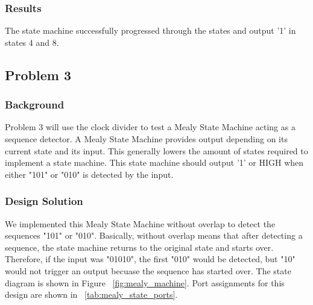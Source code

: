 \documentclass[11pt]{article}
\begin{document}
\subsubsection{Results}
The state machine successfully progressed through the states and output '1' in states 4 and 8.

\subsection{Problem 3}

\subsubsection{Background}
Problem 3 will use the clock divider to test a Mealy State Machine acting as a sequence detector. A Mealy State Machine provides output depending on its current state and its input. This generally lowers the amount of states required to implement a state machine. This state machine should output '1' or HIGH when either "101" or "010" is detected by the input.

\subsubsection{Design Solution}
We implemented this Mealy State Machine without overlap to detect the sequences "101" or "010". Basically, without overlap means that after detecting a sequence, the state machine returns to the original state and starts over. Therefore, if the input was "01010", the first "010" would be detected, but "10" would not trigger an output becuase the sequence has started over. The state diagram is shown in Figure ~\ref{fig:mealy_machine}. Port assignments for this design are shown in ~\ref{tab:mealy_state_ports}.
\end{document}
